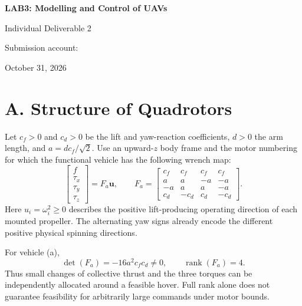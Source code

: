

\begin{center}
{\LARGE\bfseries\color{navy}LAB3: Modelling and Control of UAVs}\par
\vspace{6pt}
{\large Individual Deliverable 2}\par
\vspace{6pt}
Submission account: \par
October 31, 2026
\end{center}

\section{A. Structure of Quadrotors}
Let $c_f>0$ and $c_d>0$ be the lift and yaw-reaction coefficients, $d>0$ the
arm length, and $a=d c_f/\sqrt2$. Use an upward-$z$ body frame and the motor
numbering for which the functional vehicle has the following wrench map:
\begin{equation}
\begin{bmatrix}f\\\tau_x\\\tau_y\\\tau_z\end{bmatrix}
=F_a\mathbf u,\qquad
F_a=\begin{bmatrix}
c_f&c_f&c_f&c_f\\
a&a&-a&-a\\
-a&a&a&-a\\
c_d&-c_d&c_d&-c_d
\end{bmatrix}.
\label{eq:fa}
\end{equation}
Here $u_i=\omega_i^2\geq0$ describes the positive lift-producing operating
direction of each mounted propeller. The alternating yaw signs already encode
the different positive physical spinning directions.

For vehicle (a),
\begin{equation}
\det(F_a)=-16a^2c_fc_d\ne0,\qquad\operatorname{rank}(F_a)=4.
\end{equation}
Thus small changes of collective thrust and the three torques can be independently
allocated around a feasible hover. Full rank alone does not guarantee feasibility
for arbitrarily large commands under motor bounds.

